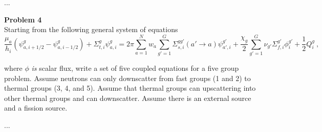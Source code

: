 \documentclass[10pt]{article}
\begin{document}
...





\newpage
\noindent \textbf{Problem 4}\\
Starting from the following general system of equations
%
\begin{equation*}
\frac{\mu_a}{h_i}(\psi_{a,i+1/2}^g - \psi_{a,i-1/2}^g)+ \Sigma_{t,i}^g\psi_{a,i}^g = 2\pi\sum_{a=1}^N w_a \sum_{g'=1}^G \Sigma_{s, i}^{gg'}(a'\rightarrow a)\psi_{a',i}^{g'} + \frac{\chi_g}{2}\sum_{g'=1}^G \nu_{g'}\Sigma_{f,i}^{g'} \phi_{i}^{g'} + \frac{1}{2}Q_i^g\:,
\end{equation*}

where  $\phi$ \textit{is} scalar flux, write a set of five coupled equations for a five group problem. Assume neutrons can only downscatter from fast groups (1 and 2) to thermal groups (3, 4, and 5). Assume that thermal groups can upscattering into other thermal groups and can downscatter. Assume there is an external source and a fission source.  

...





\end{document}

